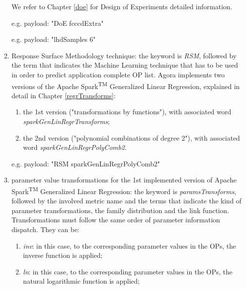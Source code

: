 \begin{enumerate}
\begin{enumerate}
    \end{enumerate}
    
    We refer to Chapter \ref{doe} for Design of Experiments detailed information.
    
    e.g. payload: "DoE fcccdExtra"
    
    e.g. payload: "lhdSamples 6"
    
    \item Response Surface Methodology technique: the keyword is \textit{RSM}, followed by the term that indicates the Machine Learning technique that has to be used in order to predict application complete OP list. Agora implements two versions of the Apache Spark\textsuperscript{TM} Generalized Linear Regression, explained in detail in Chapter \ref{regrTransforms}:
    
    \begin{enumerate}
    
        \item the 1st version ("transformations by functions"), with associated word \textit{sparkGenLinRegrTransforms};
        
        \item the 2nd version ("polynomial combinations of degree 2"), with associated word \textit{sparkGenLinRegrPolyComb2}.
    
    \end{enumerate}
    
    e.g. payload: "RSM sparkGenLinRegrPolyComb2"
    
    \item parameter value transformations for the 1st implemented version of Apache Spark\textsuperscript{TM} Generalized Linear Regression: the keyword is \textit{paramsTransforms}, followed by the involved metric name and the terms that indicate the kind of parameter transformations, the family distribution and the link function. Transformations must follow the same order of parameter information dispatch. They can be:
    
    \begin{enumerate}
    
        \item \textit{inv}: in this case, to the corresponding parameter values in the OPs, the inverse function is applied;
        
        \item \textit{ln}: in this case, to the corresponding parameter values in the OPs, the natural logarithmic function is applied;
        

\end{enumerate}
\end{enumerate}
